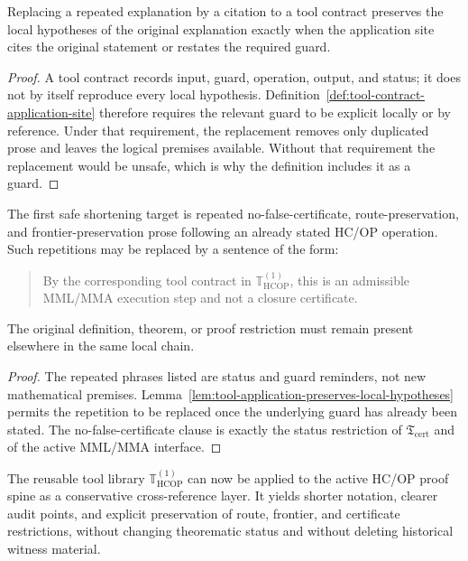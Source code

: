 \begin{lemma}
\label{lem:tool-application-preserves-local-hypotheses}
Replacing a repeated explanation by a citation to a tool contract preserves the local hypotheses of the original explanation exactly when the application site cites the original statement or restates the required guard.
\end{lemma}

\begin{proof}
A tool contract records input, guard, operation, output, and status; it does not by itself reproduce every local hypothesis. Definition~\ref{def:tool-contract-application-site} therefore requires the relevant guard to be explicit locally or by reference. Under that requirement, the replacement removes only duplicated prose and leaves the logical premises available. Without that requirement the replacement would be unsafe, which is why the definition includes it as a guard.
\end{proof}

\begin{corollary}
\label{cor:first-safe-shortening-target}
The first safe shortening target is repeated no-false-certificate, route-preservation, and frontier-preservation prose following an already stated HC/OP operation. Such repetitions may be replaced by a sentence of the form:
\begin{quote}
\small
By the corresponding tool contract in \(\mathbb T_{\mathrm{HCOP}}^{(1)}\), this is an admissible MML/MMA execution step and not a closure certificate.
\end{quote}
The original definition, theorem, or proof restriction must remain present elsewhere in the same local chain.
\end{corollary}

\begin{proof}
The repeated phrases listed are status and guard reminders, not new mathematical premises. Lemma~\ref{lem:tool-application-preserves-local-hypotheses} permits the repetition to be replaced once the underlying guard has already been stated. The no-false-certificate clause is exactly the status restriction of \(\mathfrak T_{\mathrm{cert}}\) and of the active MML/MMA interface.
\end{proof}

\begin{theorem}
\label{thm:first-tool-contract-application-theorem}
The reusable tool library \(\mathbb T_{\mathrm{HCOP}}^{(1)}\) can now be applied to the active HC/OP proof spine as a conservative cross-reference layer. It yields shorter notation, clearer audit points, and explicit preservation of route, frontier, and certificate restrictions, without changing theorematic status and without deleting historical witness material.
\end{theorem}

